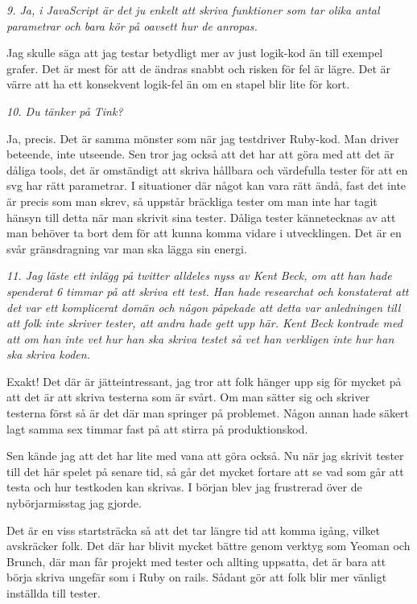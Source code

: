 \documentclass[11pt]{article}
\begin{document}
\emph{9. Ja, i JavaScript är det ju enkelt att skriva funktioner som tar olika antal parametrar och bara kör på oavsett hur de anropas.}

Jag skulle säga att jag testar betydligt mer av just logik-kod än till exempel grafer. Det är mest för att de ändras snabbt och risken för fel är lägre. Det är värre att ha ett konsekvent logik-fel än om en stapel blir lite för kort.

\emph{10. Du tänker på Tink?}

Ja, precis. Det är samma mönster som när jag testdriver Ruby-kod. Man driver beteende, inte utseende. Sen tror jag också att det har att göra med att det är dåliga tools, det är omständigt att skriva hållbara och värdefulla tester för att en svg har rätt parametrar. I situationer där något kan vara rätt ändå, fast det inte är precis som man skrev, så uppstår bräckliga tester om man inte har tagit hänsyn till detta när man skrivit sina tester. Dåliga tester kännetecknas av att man behöver ta bort dem för att kunna komma vidare i utvecklingen. Det är en svår gränsdragning var man ska lägga sin energi.

\emph{11. Jag läste ett inlägg på twitter alldeles nyss av Kent Beck, om att han hade spenderat 6 timmar på att skriva ett test. Han hade researchat och konstaterat att det var ett komplicerat domän och någon påpekade att detta var anledningen till att folk inte skriver tester, att andra hade gett upp här. Kent Beck kontrade med att om han inte vet hur han ska skriva testet så vet han verkligen inte hur han ska skriva koden.}

Exakt! Det där är jätteintressant, jag tror att folk hänger upp sig för mycket på att det är att skriva testerna som är svårt. Om man sätter sig och skriver testerna först så är det där man springer på problemet. Någon annan hade säkert lagt samma sex timmar fast på att stirra på produktionskod.

Sen kände jag att det har lite med vana att göra också. Nu när jag skrivit tester till det här spelet på senare tid, så går det mycket fortare att se vad som går att testa och hur testkoden kan skrivas. I början blev jag frustrerad över de nybörjarmisstag jag gjorde.

Det är en viss startsträcka så att det tar längre tid att komma igång, vilket avskräcker folk. Det där har blivit mycket bättre genom verktyg som Yeoman och Brunch, där man får projekt med tester och allting uppsatta, det är bara att börja skriva ungefär som i Ruby on rails. Sådant gör att folk blir mer vänligt inställda till tester.
\end{document}
